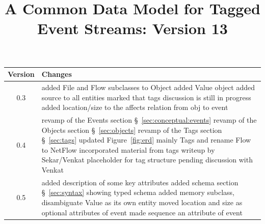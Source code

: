 \documentclass[10pt, conference, onecolumn]{IEEEtran}
\begin{document}
%
\title{A Common Data Model for Tagged Event Streams: Version 13}
\maketitle


\begin{longtable}{|c|p{17cm}|}
\hline
Version & Changes \\\hline
0.3 & \small
      added File and Flow subclasses to Object \newline  
	added Value object \newline
	added source to all entities \newline
	marked that tags discussion is still in progress \newline
	added location/size to the affects relation from obj to event
\\\hline
0.4 & \small 
	    revamp of the Events section \S~\ref{sec:conceptual:events} \newline
          revamp of the Objects section \S~\ref{sec:objects} \newline
          revamp of the Tags section \S~\ref{sec:tags} \newline
          updated Figure~\ref{fig:erd} mainly Tags and rename Flow to NetFlow
          incorporated material from tags writeup by Sekar/Venkat \newline
          placeholder for tag structure pending discussion with Venkat          
\\\hline
0.5 & \small 
        added description of some key attributes \newline
        added schema section \S~\ref{sec:syntax} showing typed schema \newline
        added memory subclass, disambiguate Value as its own entity \newline 
        moved location and size as optional attributes of event \newline
        made sequence an attribute of event \newline

\end{longtable}
\end{document}
